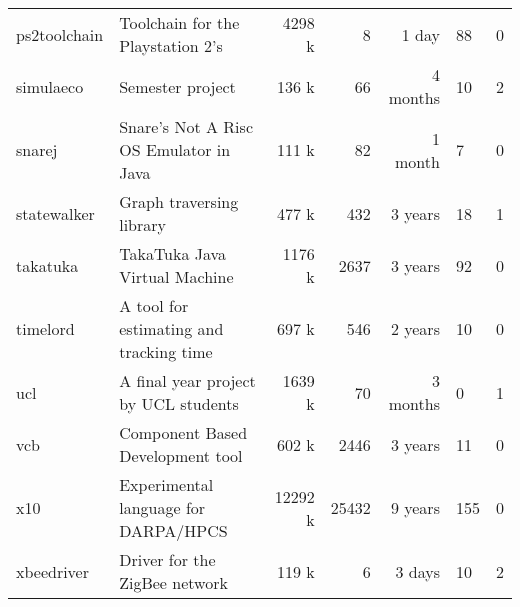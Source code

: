 \begin{table*}[htb]
\begin{tabularx}{\textwidth}{|l|l|r|r|r|Y|Y|}
  ps2toolchain & Toolchain for the Playstation 2's & 4298 k &   8 & 1 day &  88 &   0 \\ 
  simulaeco & Semester project & 136 k &  66 & 4 months &  10 &   2 \\ 
  snarej & Snare's Not A Risc OS Emulator in Java & 111 k &  82 & 1 month &   7 &   0 \\ 
  statewalker & Graph traversing library & 477 k & 432 & 3 years &  18 &   1 \\ 
  takatuka & TakaTuka Java Virtual Machine & 1176 k & 2637 & 3 years &  92 &   0 \\ 
  timelord & A tool for estimating and tracking time & 697 k & 546 & 2 years &  10 &   0 \\ 
  ucl & A final year project by UCL students & 1639 k &  70 & 3 months &   0 &   1 \\ 
  vcb & Component Based Development tool & 602 k & 2446 & 3 years &  11 &   0 \\ 
  x10 & Experimental language for DARPA/HPCS & 12292 k & 25432 & 9 years & 155 &   0 \\ 
  xbeedriver & Driver for the ZigBee network & 119 k &   6 & 3 days &  10 &   2 \\ 
   \hline
\end{tabularx}
\end{table*}
